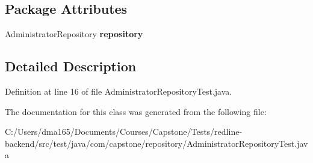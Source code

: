 \subsection*{Package Attributes}
\begin{DoxyCompactItemize}
\item 
\mbox{\label{classcom_1_1capstone_1_1repository_1_1_administrator_repository_test_a9cf9f5208424792f3954d87606d3c39f}} 
Administrator\+Repository {\bfseries repository}
\end{DoxyCompactItemize}


\subsection{Detailed Description}


Definition at line 16 of file Administrator\+Repository\+Test.\+java.



The documentation for this class was generated from the following file\+:\begin{DoxyCompactItemize}
\item 
C\+:/\+Users/dma165/\+Documents/\+Courses/\+Capstone/\+Tests/redline-\/backend/src/test/java/com/capstone/repository/Administrator\+Repository\+Test.\+java\end{DoxyCompactItemize}
